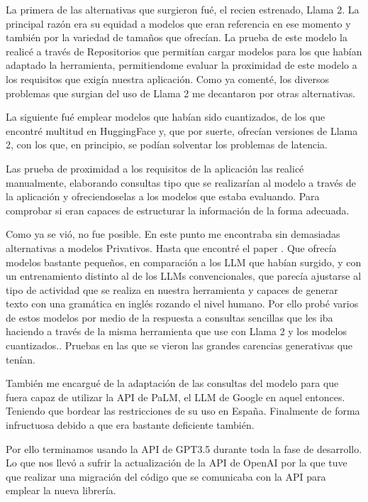La primera de las alternativas que surgieron fué, el recien estrenado, Llama 2. La principal razón era su equidad a modelos que eran referencia en ese momento y también por la variedad de tamaños que ofrecían. La prueba de este modelo la realicé a través de Repositorios que permitían cargar modelos para los que habían adaptado la herramienta, permitiendome evaluar la proximidad de este modelo a los requisitos que exigía nuestra aplicación. Como ya comenté, los diversos problemas que surgian del uso de Llama 2 me decantaron por otras alternativas.

La siguiente fué emplear modelos que habían sido cuantizados, de los que encontré multitud en HuggingFace y, que por suerte, ofrecían versiones de Llama 2, con los que, en principio, se podían solventar los problemas de latencia.

Las prueba de proximidad a los requisitos de la aplicación las realicé manualmente, elaborando consultas tipo que se realizarían al modelo a través de la aplicación y ofreciendoselas a los modelos que estaba evaluando. Para comprobar si eran capaces de estructurar la información de la forma adecuada.

Como ya se vió, no fue posible. En este punto me encontraba sin demasiadas alternativas a modelos Privativos. Hasta que encontré el paper \cite{eldan2023tinystories} . Que ofrecía modelos bastante pequeños, en comparación a los LLM que habían surgido, y con un entrenamiento distinto al de los LLMs convencionales, que parecía ajustarse al tipo de actividad que se realiza en nuestra herramienta y capaces de generar texto con una gramática en inglés rozando el nivel humano. Por ello probé varios de estos modelos por medio de la respuesta a consultas sencillas que les iba haciendo a través de la misma herramienta que use con Llama 2 y los modelos cuantizados.. Pruebas en las que se vieron las grandes carencias generativas que tenían.

También me encargué de la adaptación de las consultas del modelo para que fuera capaz de utilizar la API de PaLM, el LLM de Google en aquel entonces. Teniendo que bordear las restricciones de su uso en España. Finalmente de forma infructuosa debido a que era bastante deficiente también.

Por ello terminamos usando la API de GPT3.5 durante toda la fase de desarrollo. Lo que nos llevó a sufrir la actualización de la API de OpenAI por la que tuve que realizar una migración del código que se comunicaba con la API para emplear la nueva librería.

